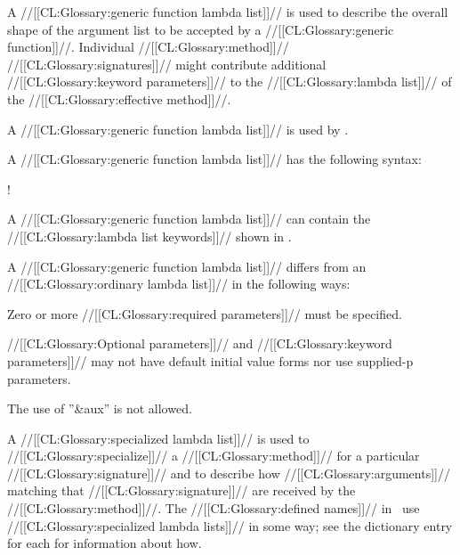 \endsubsubsection%

\endsubSection%

 

A //[[CL:Glossary:generic function lambda list]]// is used to describe the overall shape of the argument list to be accepted by a //[[CL:Glossary:generic function]]//. Individual //[[CL:Glossary:method]]// //[[CL:Glossary:signatures]]// might contribute additional  //[[CL:Glossary:keyword parameters]]// to the //[[CL:Glossary:lambda list]]// of the //[[CL:Glossary:effective method]]//.

A //[[CL:Glossary:generic function lambda list]]// is used by .

A //[[CL:Glossary:generic function lambda list]]// has the following syntax:

\Vskip 1pc! 

A //[[CL:Glossary:generic function lambda list]]// can contain the //[[CL:Glossary:lambda list keywords]]// shown in \thenextfigure.


A //[[CL:Glossary:generic function lambda list]]// differs from an //[[CL:Glossary:ordinary lambda list]]//  in the following ways:
  \beginlist {}

Zero or more //[[CL:Glossary:required parameters]]// must be specified.

  //[[CL:Glossary:Optional parameters]]// and //[[CL:Glossary:keyword parameters]]// may not have  default initial value forms nor use supplied-p parameters.


The use of ''&aux'' is not allowed.  \endlist

\endsubSection%

\goodbreak {} 

A //[[CL:Glossary:specialized lambda list]]// is used to //[[CL:Glossary:specialize]]// a //[[CL:Glossary:method]]// for a particular //[[CL:Glossary:signature]]// and to describe how //[[CL:Glossary:arguments]]// matching that //[[CL:Glossary:signature]]// are received by the //[[CL:Glossary:method]]//.   The //[[CL:Glossary:defined names]]// in \thenextfigure\ use //[[CL:Glossary:specialized lambda lists]]// in some way; see the dictionary entry for each for information about how.

